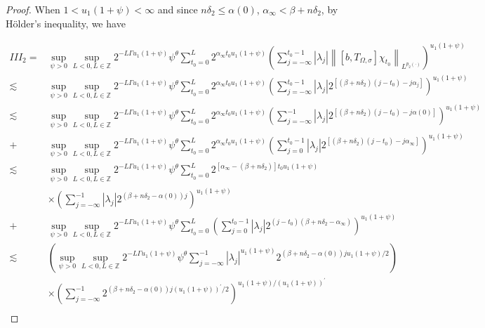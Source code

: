 \documentclass[oneside,reqno]{amsart}
\numberwithin{equation}{section}
\theoremstyle{definition}
\begin{document}
\begin{proof}
When $1<u_1(1+\psi)<\infty$ and since $n \delta_{2} \leq  \alpha(0)$, $\alpha_{\infty}<\beta+n\delta_2$, by H\"older's inequality, we have


\begin{align*}
I I I_{2}=& \sup_{\psi>0}\sup _{L <  0, L \in \mathbb{Z}} 2^{-L \Gamma u_1(1+\psi)} \psi^\theta \sum_{t_0=0}^{L} 2^{\alpha_{\infty} t_0u _1(1+\psi)}\left(\sum_{j=-\infty}^{t_0-1}\left|\lambda_{j}\right|\left\|\left[b, T_{\Omega, \sigma}\right] \chi_{t_0}\right\|_{L^{p_2(\cdot)}}\right)^{u_1(1+\psi)} \\
 \lesssim & \sup_{\psi>0}\sup _{L <  0, L \in \mathbb{Z}} 2^{-L \Gamma u_1(1+\psi)} \psi^\theta \sum_{t_0=0}^{L} 2^{\alpha_{\infty} t_0u _1(1+\psi)}\left(\sum_{j=-\infty}^{t_0-1}\left|\lambda_{j}\right| 2^{\left[(\beta+n\delta_2)(j-t_0)-j \alpha_{j}\right]}\right)^{u_1(1+\psi)} \\
\lesssim & \sup_{\psi>0}\sup _{L <  0, L \in \mathbb{Z}} 2^{-L \Gamma u_1(1+\psi)} \psi^\theta \sum_{t_0=0}^{L} 2^{\alpha_{\infty} t_0u _1(1+\psi)}\left(\sum_{j=-\infty}^{-1}\left|\lambda_{j}\right| 2^{\left[(\beta+n\delta_2)(j-t_0)-j \alpha(0)\right]}\right)^{u_1(1+\psi)} \\
 +&\sup_{\psi>0}\sup _{L <  0, L \in \mathbb{Z}} 2^{-L \Gamma u_1(1+\psi)} \psi^\theta \sum_{t_0=0}^{L} 2^{\alpha_{\infty} t_0u _1(1+\psi)}\left(\sum_{j=0}^{t_0-1}\left|\lambda_{j}\right| 2^{\left[(\beta+n\delta_2)(j-t_0)-j \alpha_{\infty}\right]}\right)^{u_1(1+\psi)} \\
\lesssim & \sup_{\psi>0}\sup _{L <  0, L \in \mathbb{Z}} 2^{-L \Gamma u_1(1+\psi)} \psi^\theta \sum_{t_0=0}^{L} 2^{\left[\alpha_{\infty}-(\beta+n\delta_2)\right] t_0u _1(1+\psi)} \\
 &\times \left(\sum_{j=-\infty}^{-1}\left|\lambda_{j}\right| 2^{\left(\beta+n\delta_2-\alpha(0)\right) j}\right)^{u_1(1+\psi)} \\
+& \sup_{\psi>0}\sup _{L <  0, L \in \mathbb{Z}} 2^{-L \Gamma u_1(1+\psi)} \psi^\theta \sum_{t_0=0}^{L}\left(\sum_{j=0}^{t_0-1}\left|\lambda_{j}\right| 2^{(j-t_0)\left(\beta+n\delta_2-\alpha_{\infty}\right)}\right)^{u_1(1+\psi)} \\
\lesssim & \left(\sup_{\psi>0}\sup _{L <  0, L \in \mathbb{Z}} 2^{-L \Gamma u_1(1+\psi)} \psi^\theta\sum_{j=-\infty}^{-1}\left|\lambda_{j}\right|^{u_1(1+\psi)} 2^{\left(\beta+n\delta_2-\alpha(0)\right) j u_1(1+\psi) / 2}\right) \\
 &\times\left(\sum_{j=-\infty}^{-1} 2^{\left(\beta+n\delta_2-\alpha(0)\right) j (u_1(1+\psi))^{\prime} / 2}\right)^{u_1(1+\psi) / (u_1(1+\psi))^{\prime}} \\

\end{align*}
\end{proof}
\end{document}
